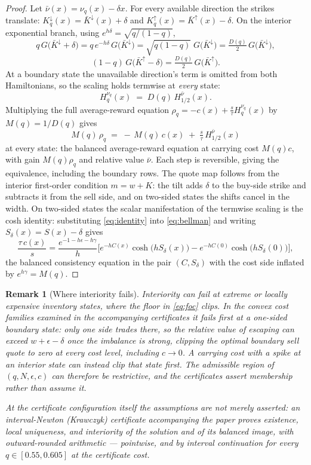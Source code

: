 \documentclass[11pt]{article}
\newtheorem{remark}{Remark}
\begin{document}
\begin{proof}
Let $\bar\nu(x) = \nu_q(x) - \delta x$. For every available direction the strikes translate: $K^{\downarrow}_q(x) = \bar K^{\downarrow}(x) + \delta$ and $K^{\uparrow}_q(x) = \bar K^{\uparrow}(x) - \delta$. On the interior exponential branch, using $e^{h\delta} = \sqrt{q/(1-q)}$,
\[
q\,G\big(\bar K^{\downarrow} + \delta\big) = q\,e^{-h\delta}\,G\big(\bar K^{\downarrow}\big) = \sqrt{q(1-q)}\;G\big(\bar K^{\downarrow}\big) = \tfrac{D(q)}{2}\,G\big(\bar K^{\downarrow}\big),
\]
\[
(1-q)\,G\big(\bar K^{\uparrow} - \delta\big) = \tfrac{D(q)}{2}\,G\big(\bar K^{\uparrow}\big).
\]
At a boundary state the unavailable direction's term is omitted from both Hamiltonians, so the scaling holds termwise at \emph{every} state:
\[
H^{\nu_q}_q(x) \;=\; D(q)\,H^{\bar\nu}_{1/2}(x).
\]
Multiplying the full average-reward equation $\rho_q = -c(x) + \tfrac{s}{\tau} H^{\nu_q}_q(x)$ by $M(q) = 1/D(q)$ gives
\[
M(q)\,\rho_q \;=\; -\,M(q)\,c(x) \;+\; \tfrac{s}{\tau}\,H^{\bar\nu}_{1/2}(x)
\]
at every state: the balanced average-reward equation at carrying cost $M(q)c$, with gain $M(q)\rho_q$ and relative value $\bar\nu$. Each step is reversible, giving the equivalence, including the boundary rows. The quote map follows from the interior first-order condition $m = w + K$: the tilt adds $\delta$ to the buy-side strike and subtracts it from the sell side, and on two-sided states the shifts cancel in the width. On two-sided states the scalar manifestation of the termwise scaling is the cosh identity: substituting \eqref{eq:identity} into \eqref{eq:bellman} and writing $S_\delta(x) = S(x) - \delta$ gives
\[
\frac{\tau\,c(x)}{s} = \frac{e^{-1-h\epsilon-h\gamma}}{h}
\Big[ e^{-hC(x)}\cosh\big(hS_\delta(x)\big) - e^{-hC(0)}\cosh\big(hS_\delta(0)\big) \Big],
\]
the balanced consistency equation in the pair $(C, S_\delta)$ with the cost side inflated by $e^{h\gamma} = M(q)$.
\end{proof}

\begin{remark}[Where interiority fails]\label{rem:interiority}
Interiority can fail at extreme or locally expensive inventory states, where the floor in \eqref{eq:foc} clips. In the convex cost families examined in the accompanying certificates it fails first at a one-sided boundary state: only one side trades there, so the relative value of escaping can exceed $w + \epsilon - \delta$ once the imbalance is strong, clipping the optimal boundary sell quote to zero at every cost level, including $c \to 0$. A carrying cost with a spike at an interior state can instead clip that state first. The admissible region of $(q, N, \epsilon, c)$ can therefore be restrictive, and the certificates assert membership rather than assume it.

At the certificate configuration itself the assumptions are not merely asserted: an interval-Newton (Krawczyk) certificate accompanying the paper proves existence, local uniqueness, and interiority of the solution and of its balanced image, with outward-rounded arithmetic --- pointwise, and by interval continuation for every $q \in [0.55, 0.605]$ at the certificate cost.
\end{remark}
\end{document}
